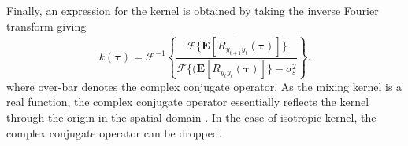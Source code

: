 \documentclass[10pt,twocolumn,twoside]{IEEEtran}
\begin{document}
 Finally, an expression for the kernel is obtained by taking the inverse Fourier transform giving
\begin{equation}\label{eq:EM-KernelSolution}
	k(\boldsymbol\tau) = \mathcal{F}^{-1}\overline{\left\{\frac{\mathcal{F}\{\mathbf{E}[R_{y_{t+1}y_t}(\boldsymbol{\tau})]\}}{\mathcal{F}\{(\mathbf{E}\left[R_{y_ty_t}(\boldsymbol\tau)\right]\} - \sigma_{\varepsilon}^2 }\right\}}.
\end{equation}
where over-bar denotes the complex conjugate operator. As the mixing kernel is a real function, the complex conjugate operator essentially reflects the kernel through the origin in the spatial domain \cite{Bracewell2000}. In the case of isotropic kernel, the complex conjugate operator can be dropped. 
\end{document}
